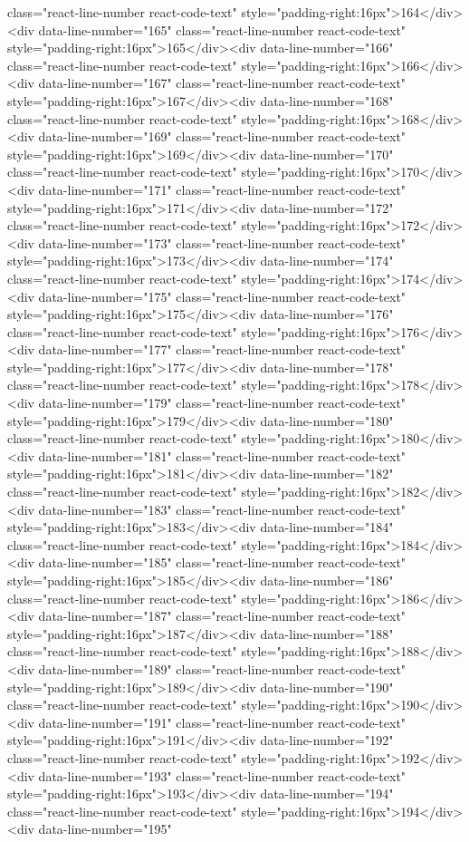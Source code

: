 {{{{{{{{{{{{{{{{{{{{{{{{{{{{{{{class="react-line-number react-code-text" style="padding-right:16px">164</div><div data-line-number="165" class="react-line-number react-code-text" style="padding-right:16px">165</div><div data-line-number="166" class="react-line-number react-code-text" style="padding-right:16px">166</div><div data-line-number="167" class="react-line-number react-code-text" style="padding-right:16px">167</div><div data-line-number="168" class="react-line-number react-code-text" style="padding-right:16px">168</div><div data-line-number="169" class="react-line-number react-code-text" style="padding-right:16px">169</div><div data-line-number="170" class="react-line-number react-code-text" style="padding-right:16px">170</div><div data-line-number="171" class="react-line-number react-code-text" style="padding-right:16px">171</div><div data-line-number="172" class="react-line-number react-code-text" style="padding-right:16px">172</div><div data-line-number="173" class="react-line-number react-code-text" style="padding-right:16px">173</div><div data-line-number="174" class="react-line-number react-code-text" style="padding-right:16px">174</div><div data-line-number="175" class="react-line-number react-code-text" style="padding-right:16px">175</div><div data-line-number="176" class="react-line-number react-code-text" style="padding-right:16px">176</div><div data-line-number="177" class="react-line-number react-code-text" style="padding-right:16px">177</div><div data-line-number="178" class="react-line-number react-code-text" style="padding-right:16px">178</div><div data-line-number="179" class="react-line-number react-code-text" style="padding-right:16px">179</div><div data-line-number="180" class="react-line-number react-code-text" style="padding-right:16px">180</div><div data-line-number="181" class="react-line-number react-code-text" style="padding-right:16px">181</div><div data-line-number="182" class="react-line-number react-code-text" style="padding-right:16px">182</div><div data-line-number="183" class="react-line-number react-code-text" style="padding-right:16px">183</div><div data-line-number="184" class="react-line-number react-code-text" style="padding-right:16px">184</div><div data-line-number="185" class="react-line-number react-code-text" style="padding-right:16px">185</div><div data-line-number="186" class="react-line-number react-code-text" style="padding-right:16px">186</div><div data-line-number="187" class="react-line-number react-code-text" style="padding-right:16px">187</div><div data-line-number="188" class="react-line-number react-code-text" style="padding-right:16px">188</div><div data-line-number="189" class="react-line-number react-code-text" style="padding-right:16px">189</div><div data-line-number="190" class="react-line-number react-code-text" style="padding-right:16px">190</div><div data-line-number="191" class="react-line-number react-code-text" style="padding-right:16px">191</div><div data-line-number="192" class="react-line-number react-code-text" style="padding-right:16px">192</div><div data-line-number="193" class="react-line-number react-code-text" style="padding-right:16px">193</div><div data-line-number="194" class="react-line-number react-code-text" style="padding-right:16px">194</div><div data-line-number="195" }}}}}}}}}}}}}}}}}}}}}}}}}}}}}}}
